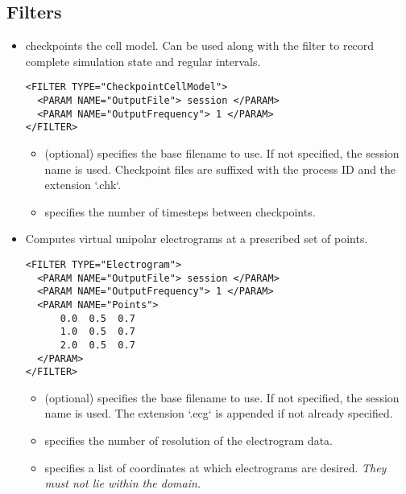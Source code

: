 \subsection{Filters}
\begin{itemize}
    \item {} checkpoints the cell model. Can be
    used along with the  filter to record complete simulation
    state and regular intervals.
\begin{lstlisting}[style=XmlStyle]
<FILTER TYPE="CheckpointCellModel">
  <PARAM NAME="OutputFile"> session </PARAM>
  <PARAM NAME="OutputFrequency"> 1 </PARAM>
</FILTER>
\end{lstlisting}
    \begin{itemize}
        \item {} (optional) specifies the base filename to use.
    If not specified, the session name is used. Checkpoint files are suffixed with the process ID and the extension `.chk`.
        \item {} specifies the number of timesteps between
    checkpoints.
    \end{itemize}
    
    \item {} Computes virtual unipolar electrograms at a
     prescribed set of points.
\begin{lstlisting}[style=XmlStyle]
<FILTER TYPE="Electrogram">
  <PARAM NAME="OutputFile"> session </PARAM>
  <PARAM NAME="OutputFrequency"> 1 </PARAM>
  <PARAM NAME="Points">
      0.0  0.5  0.7
      1.0  0.5  0.7
      2.0  0.5  0.7
  </PARAM>
</FILTER>
\end{lstlisting}
    \begin{itemize}
    \item {} (optional) specifies the base filename to use. If
    not specified, the session name is used. The extension `.ecg` is appended if not already specified.
    \item {} specifies the number of resolution of the
    electrogram data.
    \item {} specifies a list of coordinates at which electrograms
    are desired. \emph{They must not lie within the domain.}
    \end{itemize}


\end{itemize}
